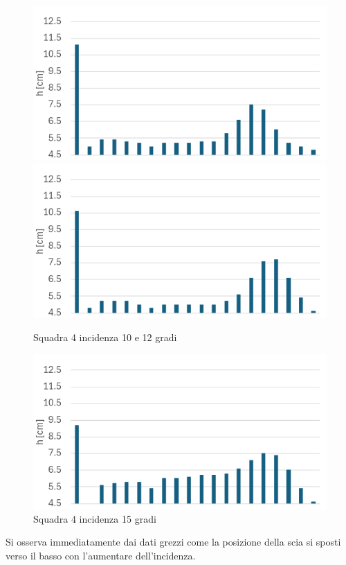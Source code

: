 \begin{figure}[H]
    \centering
    \includegraphics[width=.49\textwidth]{images/6/s4a10.png}
    \includegraphics[width=.49\textwidth]{images/6/s4a12.png}
    \caption{Squadra 4 incidenza 10 e 12 gradi}
\end{figure}
\begin{figure}[H]
    \centering
    \includegraphics[width=.49\textwidth]{images/6/s4a15.png}
    \caption{Squadra 4 incidenza 15 gradi}
\end{figure}

\noindent Si osserva immediatamente dai dati grezzi come la posizione della scia si sposti verso il basso con l'aumentare dell'incidenza.

